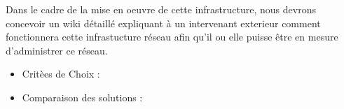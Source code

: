 \documentclass[../Livrable1.tex]{subfiles}
\begin{document}
Dans le cadre de la mise en oeuvre de cette infrastructure, nous devrons concevoir un wiki détaillé expliquant à un
intervenant exterieur comment fonctionnera cette infrastucture réseau afin qu'il ou elle puisse être en mesure d'administrer ce réseau.

\begin{itemize}
    \item Critèes de Choix :
    \item Comparaison des solutions :
\end{itemize}
\end{document}
